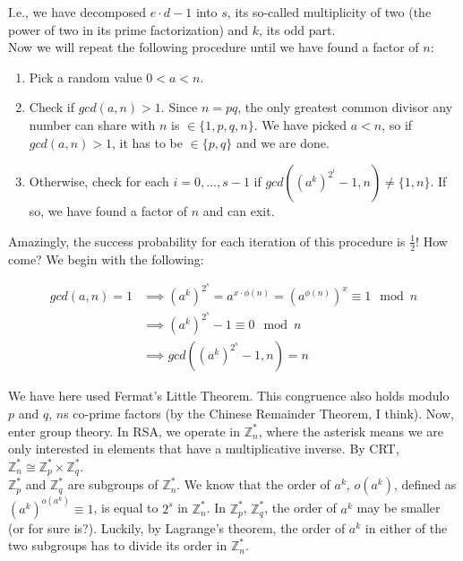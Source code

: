\documentclass{article}
\begin{document}
I.e., we have decomposed $e \cdot d-1$ into $s$, its so-called multiplicity of two (the power of two in its prime factorization) and $k$, its odd part.\\

Now we will repeat the following procedure until we have found a factor of $n$:

\begin{enumerate}
    \item Pick a random value $0 < a < n$.
    \item Check if $gcd(a,n) > 1$. Since $n=pq$, the only greatest common divisor any number can share with $n$ is $\in \{1,p,q,n\}$. We have picked $a < n$, so if $gcd(a,n) > 1$, it has to be $\in \{p,q\}$ and we are done.
    \item Otherwise, check for each $i = 0, ..., s-1$ if $gcd((a^k)^{2^i}-1, n) \ne \{1,n\}$. If so, we have found a factor of $n$ and can exit.
\end{enumerate}

Amazingly, the success probability for each iteration of this procedure is $\frac{1}{2}$! How come? We begin with the following:

\begin{align*}
    gcd(a,n) = 1 &\implies (a^k)^{2^s} = a^{x\cdot \phi(n)} = (a^{\phi(n)})^x 
                 \equiv   1 \mod n \\
                 &\implies (a^k)^{2^s} - 1 \equiv 0 \mod n \\
                 &\implies gcd((a^k)^{2^s}-1, n) = n
\end{align*}

We have here used Fermat's Little Theorem. This congruence also holds modulo $p$ and $q$, $n$s co-prime factors (by the Chinese Remainder Theorem, I think). Now, enter group theory. In RSA, we operate in $\mathbb{Z}_{n}^{*}$, where the asterisk means we are only interested in elements that have a multiplicative inverse. By CRT, $\mathbb{Z}_{n}^{*} \cong \mathbb{Z}_{p}^{*} \times \mathbb{Z}_{q}^{*}$. \\

$\mathbb{Z}_{p}^{*}$ and $\mathbb{Z}_{q}^{*}$ are subgroups of $\mathbb{Z}_{n}^{*}$. We know that the order of $a^k$, $o(a^k)$, defined as $(a^k)^{o(a^k)} \equiv 1$, is equal to $2^s$ in $\mathbb{Z}_{n}^{*}$. In $\mathbb{Z}_{p}^{*}$, $\mathbb{Z}_{q}^{*}$, the order of $a^k$ may be smaller (or for sure is?). Luckily, by Lagrange's theorem, the order of $a^k$ in either of the two subgroups has to divide its order in $\mathbb{Z}_{n}^{*}$. \\
\end{document}
